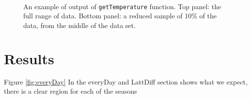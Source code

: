 \documentclass[a4paper,12pt]{article}
\begin{document}
\begin{figure}
    \centering
    \\
    \caption{An example of output of \texttt{getTemperature} function. Top panel:
    the full range of data. Bottom panel: a reduced sample of 10\% of the data,
    from the middle of the data set.}
    \label{fig:getTemperature}
\end{figure}



\section{Results}



Figure \ref{fig:everyDay} In the everyDay and LattDiff section shows what we expect, there is a clear region for each of the seasons 
\end{document}
